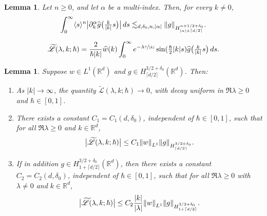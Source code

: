 \documentclass[10pt,a4paper]{article}
\newenvironment{enumeratea}
{\bgroup\def\theenumi{\alph{enumi}}\begin{enumerate}}
{\end{enumerate}\egroup}
\newcommand{\babs}[1]{\bigl|#1\bigr|}
\theoremstyle{plain}
\newtheorem{lemma}[theorem]{Lemma}
\theoremstyle{remark}
\newcommand{\bbr}[1]{\bigl(#1 \bigr)}
\newcommand{\ak}{\abs{k}}
\newcommand{\aal}{\abs{\alpha}}
\newcommand{\p}{\partial}
\newcommand{\jb}[1]{\langle#1\rangle}
\newcommand{\mytextfrac}[2]{{\textstyle\frac{#1}{#2}}}
\newcommand{\R}{\mathbb{R}}
\newcommand{\lam}{\lambda}
\newcommand{\ceils}[1]{\lceil#1\rceil}
\begin{document}
\begin{lemma}\label{gnorm}
Let \( n \geq 0 \), and let \( \alpha \) be a multi-index. Then, for every $k\neq0$,
\begin{align*}
\int_0^\infty\jb{s}^{n}\babs{\p^\alpha_k\widehat g\bbr{\mytextfrac{k}{\abs{k}}s}}\,ds\lesssim_{d,
\delta_0,n,\aal}\norm{g}_{H^{n+{{1/2}}+\delta_0}_{\aal+\ceils{d/2}}}.\end{align*}
\end{lemma}

\begin{align}
\widetilde {\mathscr L}(\lam,k;\hbar)
= \frac{2}{\hbar\ak} \widehat w(k) \int_0^\infty e^{-\lam \sfrac{s}{\ak}} \sin(\mytextfrac{\hbar}{2} \ak s) \widehat g\bbr{\mytextfrac{k}{\ak}s} \, ds. \label{Lingoodcoordinates}
\end{align}

\begin{lemma}\label{boundedness and decay lemma}
Suppose $w\in L^1(\R^d)$ and $g\in H^{3/2+\delta_0}_{\ceils{d/2}}(\R^d)$. Then:\vspace*{-3pt}
\begin{enumeratea}
\item \label{(a)} As $\ak\to\infty$, the quantity $\widetilde {\mathscr L}(\lam,k;\hbar)\to0$, with decay uniform in $\Re\lam\geq0$ and $\hbar\in[0,1]$.

\item \label{(b)}There exists a constant $C_1=C_1(d,\delta_0)$, independent of $\hbar\in [0,1]$, such that for all $\Re\lam\geq0$ and $k\in\R^d$,\vspace*{-3pt}
\begin{align*}
\babs{\widetilde {\mathscr L}(\lam,k;\hbar)}\leq C_1\norm{w}_{L^1}\norm{g}_{H^{3/2+\delta_0}_{\ceils{d/2}}}.
\end{align*}
\item \label{(c)} If in addition $g\in H^{3/2+\delta_0}_{1+\ceils{d/2}}(\R^d)$, then there exists a constant $C_2=C_2(d,\delta_0)$, independent of $\hbar\in [0,1]$, such that for all $\Re\lam\geq0$ with $\lam\neq0$ and $k\in\R^d$,\vspace*{-3pt}
\begin{align*}
\babs{\widetilde {\mathscr L}(\lam,k;\hbar)}\leq C_2\frac{\ak}{\abs{\lam}}\norm{w}_{L^1}\norm{g}_{H^{3/2+\delta_0}_{1+\ceils{d/2}}}.
\end{align*}
\end{enumeratea}
\end{lemma}
\end{document}
